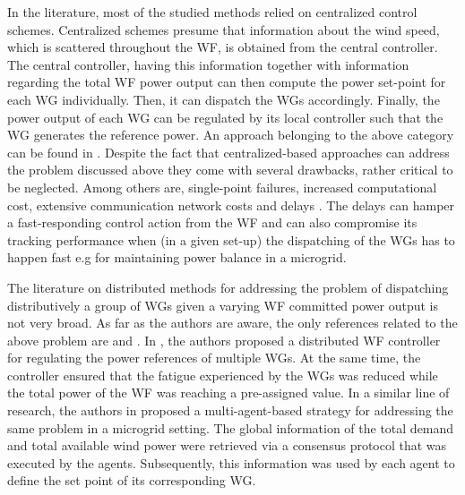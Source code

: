 \documentclass[letterpaper, 10 pt, conference]{ieeeconf}
\begin{document}
In the literature, most of the studied methods  relied  on centralized control schemes. Centralized schemes presume that information about the  wind speed, which is scattered throughout the WF, is obtained from the central controller. The central controller, having this information together with information regarding the total WF power output can then compute the power set-point for each WG individually. Then, it can dispatch the WGs accordingly. Finally, the power output of each WG can be regulated by its local controller such that the WG generates the reference power. An approach belonging to the above category can be found in \cite{constantpower}. Despite the fact that centralized-based approaches can address the problem discussed above they come with several drawbacks, rather critical to be neglected. Among others are, single-point failures, increased computational cost, extensive communication network costs and delays \cite{selforga}. The delays can hamper a fast-responding control action from the WF and can also compromise its tracking performance when (in a given set-up) the dispatching of the WGs has to happen fast e.g for maintaining power balance in a microgrid.
\par The literature on distributed methods for addressing the problem of dispatching distributively a group of WGs given a varying WF committed power output is not very broad. As far as the authors are aware, the only references related to the above problem are \cite{fullydistribdfig} and \cite{biegel}. In \cite{biegel}, the authors proposed  a distributed WF controller for regulating the power references of multiple WGs. At the same time, the controller ensured that the fatigue experienced by the WGs was reduced while the total power of the WF was reaching a pre-assigned value. In a similar line of research, the authors in \cite{fullydistribdfig} proposed a multi-agent-based strategy for addressing the same problem in a microgrid setting. 
The global information of the total demand and total available wind power were retrieved via a consensus protocol that was executed by the agents. Subsequently, this information was used by each agent to define the set point of its corresponding WG. 
\end{document}

